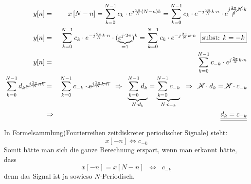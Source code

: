 \begin{uebsp}
\begin{Answer}
\begin{enumerate}[a)]
        \begin{eqnarray*}
            y[n]&=&x\left[N-n\right]=\sum_{k=0}^{N-1}c_k\cdot e^{j\frac{2\pi}{N}\left(N-n\right)k}=
            \sum_{k=0}^{N-1}c_k\cdot e^{-j\frac{2\pi}{N}k\cdot n}\cdot e^{j\frac{2\pi}{\cancel N}\cancel N\cdot k}\\
            y[n]&=&\sum_{k=0}^{N-1}c_k\cdot e^{-j\frac{2\pi}{N}k\cdot n}\cdot (\underbrace{e^{j\cdot 2\pi}}_{=1})^k=\sum_{k=0}^{N-1}c_k\cdot e^{-j\frac{2\pi}{N}k\cdot n}\;\;\fbox{subst: $k=-k$}\\
            y[n]&=&\sum_{k=0}^{N-1}c_{-k}\cdot e^{j\frac{2\pi}{N}k\cdot n}\\
            \sum_{k=0}^{N-1}d_k\cancel{e^{j\frac{2\pi}{N}nk}}&=&\sum_{k=0}^{N-1}c_{-k}\cdot \cancel{e^{j\frac{2\pi}{N}k\cdot n}}\;\;\Rightarrow\;\;
            \underbrace{\sum_{k=0}^{N-1}d_{k}}_{N\cdot d_{k}}=\underbrace{\sum_{k=0}^{N-1}c_{-k}}_{N\cdot c_{-k}}\;\;\Rightarrow\;\;
            \cancel N\cdot d_k=\cancel N\cdot c_{-k}\\
            &\Rightarrow& \underline{\underline{d_k=c_{-k}}}
        \end{eqnarray*}
        \begin{hint}In Formelsammlung(Fourierreihen zeitdiskreter periodischer Signale) steht:
                \[x[-n]\Leftrightarrow c_{-k}\]
                Somit hätte man sich die ganze Berechnung erspart, wenn man erkannt hätte, dass 
                \[x[-n]=x[N-n]\;\;\Leftrightarrow\;\;c_{-k}\]
                denn das Signal ist ja sowieso $N$-Periodisch.
            \end{hint}


\end{enumerate}
\end{Answer}
\end{uebsp}

